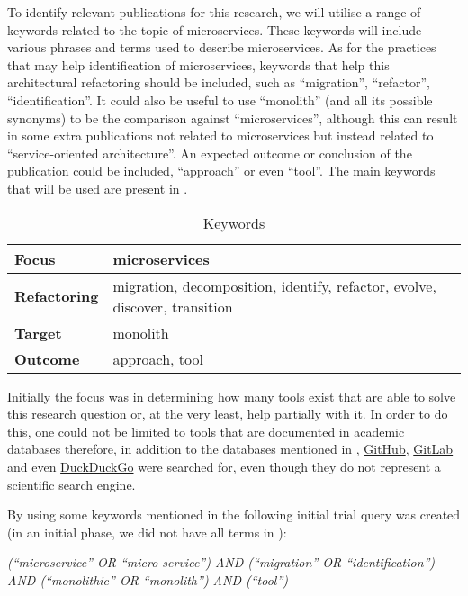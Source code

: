 To identify relevant publications for this research, we will utilise a range of
keywords related to the topic of microservices. These keywords will include
various phrases and terms used to describe microservices. As for the practices
that may help identification of microservices, keywords that help this
architectural refactoring should be included, such as ``migration'',
``refactor'', ``identification''. It could also be useful to use ``monolith''
(and all its possible synonyms) to be the comparison against ``microservices'',
although this can result in some extra publications not related to
microservices but instead related to ``service-oriented architecture''. An
expected outcome or conclusion of the publication could be included,
``approach'' or even ``tool''. The main keywords that will be used are present
in .

\begin{table}[!htb] \caption{Keywords} \label{tab:keywords}
  \begin{center}
    \begin{tabular}[c]{p{7em}|p{13em}} {\textbf{Focus}} & microservices \\
      \hline \textbf{Refactoring} & {migration, decomposition, identify, refactor, evolve, discover, transition } \\
      \hline \textbf{Target} & monolith \\
      \hline \textbf{Outcome} & approach, tool \\
    \end{tabular}
  \end{center}
\end{table}

Initially the focus was in determining how many tools exist that are able to
solve this research question or, at the very least, help partially with it. In
order to do this, one could not be limited to tools that are documented in
academic databases therefore, in addition to the databases mentioned in
, \href{https://github.com}{GitHub},
\href{https://gitlab.com}{GitLab} and even
\href{https://duckduckgo.org}{DuckDuckGo} were searched for, even though they
do not represent a scientific search engine.

By using some keywords mentioned in  the following initial
trial query was created (in an initial phase, we did not have all terms in
):

\begin{center}
  \emph{(``microservice'' OR ``micro-service'') AND (``migration'' OR
  ``identification'') AND (``monolithic'' OR ``monolith'') AND (``tool'')}
\end{center}


